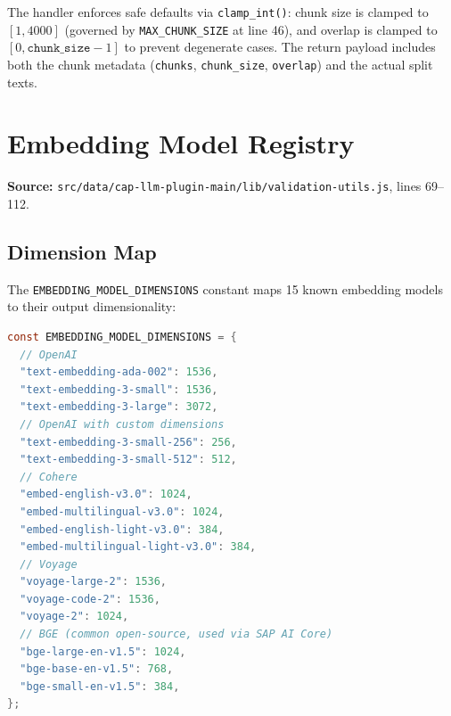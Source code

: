 \documentclass[11pt]{article}
\begin{document}
The handler enforces safe defaults via \texttt{clamp\_int()}: chunk size is clamped
to $[1, 4000]$ (governed by \texttt{MAX\_CHUNK\_SIZE} at line 46), and overlap is
clamped to $[0, \texttt{chunk\_size} - 1]$ to prevent degenerate cases. The return
payload includes both the chunk metadata (\texttt{chunks}, \texttt{chunk\_size},
\texttt{overlap}) and the actual split texts.

\section{Embedding Model Registry}
\label{sec:model-registry}

\noindent\textbf{Source:}
\texttt{src/data/cap-llm-plugin-main/lib/validation-utils.js}, lines 69--112.

\subsection{Dimension Map}

The \texttt{EMBEDDING\_MODEL\_DIMENSIONS} constant maps 15 known embedding models
to their output dimensionality:

\begin{lstlisting}[language=Java,caption={Model registry --- lines 73--94}]
const EMBEDDING_MODEL_DIMENSIONS = {
  // OpenAI
  "text-embedding-ada-002": 1536,
  "text-embedding-3-small": 1536,
  "text-embedding-3-large": 3072,
  // OpenAI with custom dimensions
  "text-embedding-3-small-256": 256,
  "text-embedding-3-small-512": 512,
  // Cohere
  "embed-english-v3.0": 1024,
  "embed-multilingual-v3.0": 1024,
  "embed-english-light-v3.0": 384,
  "embed-multilingual-light-v3.0": 384,
  // Voyage
  "voyage-large-2": 1536,
  "voyage-code-2": 1536,
  "voyage-2": 1024,
  // BGE (common open-source, used via SAP AI Core)
  "bge-large-en-v1.5": 1024,
  "bge-base-en-v1.5": 768,
  "bge-small-en-v1.5": 384,
};
\end{lstlisting}
\end{document}
